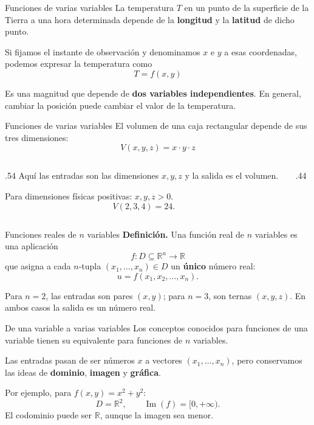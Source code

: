 \documentclass[main.tex]{subfiles}
\begin{document}
\begin{frame}{Funciones de varias variables}
La temperatura $T$ en un punto de la superficie de la Tierra a una hora determinada depende de la \textbf{longitud} y la \textbf{latitud} de dicho punto.
\medskip

Si fijamos el instante de observación y denominamos $x$ e $y$ a esas coordenadas, podemos expresar la temperatura como
\[
\boxed{T=f(x,y)}
\]
\medskip

Es una magnitud que depende de \textbf{dos variables independientes}. En general, cambiar la posición puede cambiar el valor de la temperatura.
\end{frame}
\begin{frame}{Funciones de varias variables}
El volumen de una caja rectangular depende de sus tres dimensiones:
\[
\boxed{V(x,y,z)=x\cdot y\cdot z}
\]
\begin{columns}[c]
\begin{column}{.54\textwidth}
Aquí las entradas son las dimensiones $x,y,z$ y la salida es el volumen.
\medskip

Para dimensiones físicas positivas: $x,y,z>0$.
\[
V(2,3,4)=24.
\]
\end{column}
\begin{column}{.44\textwidth}
\end{column}
\end{columns}
\end{frame}
\begin{frame}{Funciones reales de $n$ variables}
\textbf{Definición.} Una función real de $n$ variables es una aplicación
\[
f:D\subseteq\mathbb R^n\longrightarrow\mathbb R
\]
que asigna a cada $n$-tupla $(x_1,\ldots,x_n)\in D$ un \textbf{único} número real:
\[
u=f(x_1,x_2,\ldots,x_n).
\]
\medskip

Para $n=2$, las entradas son pares $(x,y)$; para $n=3$, son ternas $(x,y,z)$. En ambos casos la salida es un número real.
\end{frame}
\begin{frame}{De una variable a varias variables}
Los conceptos conocidos para funciones de una variable tienen su equivalente para funciones de $n$ variables.
\medskip

Las entradas pasan de ser números $x$ a vectores
$(x_1,\ldots,x_n)$, pero conservamos las ideas de
\textbf{dominio}, \textbf{imagen} y \textbf{gráfica}.
\medskip

Por ejemplo, para $f(x,y)=x^2+y^2$:
\[
D=\mathbb R^2,\qquad \operatorname{Im}(f)=[0,+\infty).
\]
El codominio puede ser $\mathbb R$, aunque la imagen sea menor.
\end{frame}
\end{document}
